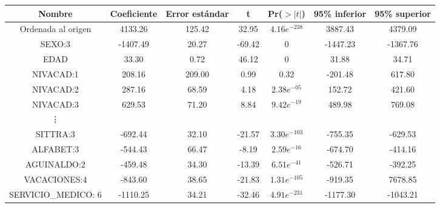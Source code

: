 \begin{center}
	\begin{tabular}{|c|c|c|c|c|c|c|} 
		\hline
		Nombre & Coeficiente & Error estándar & t & Pr($>|t|$) & 95\% inferior & 95\% superior \\ 
		\hline 
		Ordenada al origen & 4133.26 & 125.42 & 32.95 & $4.16e^{-238}$ & 3887.43 & 4379.09\\ 
		
		SEXO:3 & -1407.49 & 20.27 & -69.42 & 0 & -1447.23 & -1367.76 \\ 
		
		EDAD & 33.30 & 0.72 & 46.12 & 0 & 31.88 & 34.71 \\ 
		
		NIVACAD:1 & 208.16 & 209.00 & 0.99 & 0.32 & -201.48 & 617.80 \\
		
		NIVACAD:2 & 287.16 & 68.59 & 4.18 & $2.38e^{-05}$ & 152.72 & 421.60 \\
		
		NIVACAD:3 & 629.53 & 71.20 & 8.84 & $9.42e^{-19}$ & 489.98 & 769.08 \\
		
		\vdots \\
		
		SITTRA:3 & -692.44 & 32.10 & -21.57 & $3.30e^{-103}$ & -755.35 & -629.53 \\
		
		ALFABET:3 & -544.43 & 66.47 & -8.19 & $2.59e^{-16}$ & -674.70 & -414.16 \\
		
		AGUINALDO:2 & -459.48 & 34.30 & -13.39 & $6.51e^{-41}$ & -526.71 & -392.25 \\
		
		VACACIONES:4 & -843.60 & 38.65 & -21.83 & $1.31e^{-105}$ & -919.35 & 7678.85 \\
		
		SERVICIO\_MEDICO: 6 & -1110.25 & 34.21 & -32.46 & $4.91e^{-231}$ & -1177.30 & -1043.21 \\
	
		\hline
	\end{tabular} 
	 \label{res_fit10_2500mil}
\end{center}


